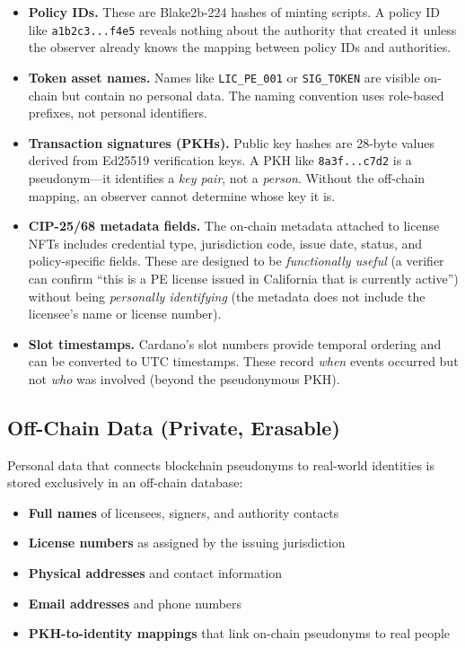 \begin{itemize}[leftmargin=*, nosep, itemsep=4pt]
  \item \textbf{Policy IDs.}  These are Blake2b-224 hashes of minting
    scripts.  A policy ID like \texttt{a1b2c3...f4e5} reveals nothing about
    the authority that created it unless the observer already knows the
    mapping between policy IDs and authorities.
  \item \textbf{Token asset names.}  Names like \texttt{LIC\_PE\_001} or
    \texttt{SIG\_TOKEN} are visible on-chain but contain no personal data.
    The naming convention uses role-based prefixes, not personal identifiers.
  \item \textbf{Transaction signatures (PKHs).}  Public key hashes are
    28-byte values derived from Ed25519 verification keys.  A PKH like
    \texttt{8a3f...c7d2} is a pseudonym---it identifies a \emph{key pair},
    not a \emph{person}.  Without the off-chain mapping, an observer cannot
    determine whose key it is.
  \item \textbf{CIP-25/68 metadata fields.}  The on-chain metadata attached
    to license NFTs includes credential type, jurisdiction code, issue date,
    status, and policy-specific fields.  These are designed to be
    \emph{functionally useful} (a verifier can confirm ``this is a PE
    license issued in California that is currently active'') without being
    \emph{personally identifying} (the metadata does not include the
    licensee's name or license number).
  \item \textbf{Slot timestamps.}  Cardano's slot numbers provide temporal
    ordering and can be converted to UTC timestamps.  These record
    \emph{when} events occurred but not \emph{who} was involved (beyond
    the pseudonymous PKH).
\end{itemize}

\subsection{Off-Chain Data (Private, Erasable)}

Personal data that connects blockchain pseudonyms to real-world identities
is stored exclusively in an off-chain database:

\begin{itemize}[leftmargin=*, nosep, itemsep=4pt]
  \item \textbf{Full names} of licensees, signers, and authority contacts
  \item \textbf{License numbers} as assigned by the issuing jurisdiction
  \item \textbf{Physical addresses} and contact information
  \item \textbf{Email addresses} and phone numbers
  \item \textbf{PKH-to-identity mappings} that link on-chain pseudonyms
    to real people
\end{itemize}

